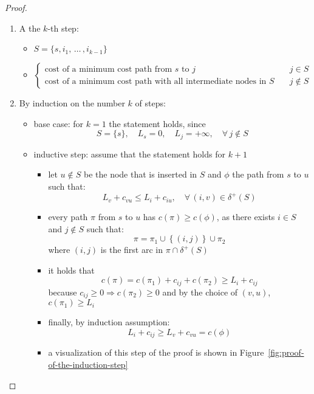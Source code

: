 \documentclass[english]{article}
\begin{document}
\begin{proof}
  \hfill
  \begin{enumerate}
    \item A the \(k\)-th step:
          \begin{itemize}
            \item \(S = \{s, i_1, \, \ldots \,, i_{k-1}\}\)
            \item \(\begin{cases}\text{cost of a minimum cost path from } s \text{ to } j & j \in S \\ \text{cost of a minimum cost path with all intermediate nodes in } S \quad & j \notin S\end{cases}\)
          \end{itemize}
    \item By induction on the number \(k\) of steps:
          \begin{itemize}
            \item base case: for \(k = 1\) the statement holds, since
                  \[S = \{s\}, \quad L_s = 0, \quad L_j = +\infty, \quad \forall \, j \notin S \]
            \item inductive step: assume that the statement holds for \(k+1\)
                  \begin{itemize}
                    \item let \(u \notin S\) be the node that is inserted in \(S\) and \(\phi\) the path from \(s\) to \(u\) such that:
                          \[ L_v + c_{vu} \leq L_i + c_{iu}, \quad \forall \, (i, v) \in \delta^+(S) \]
                    \item every path \(\pi\) from \(s\) to \(u\) has \(c(\pi) \geq c(\phi)\), as there exists \(i \in S\) and \(j \notin S\) such that:
                          \[ \pi = \pi_1 \cup \left\{ \left( i, j \right)  \right\} \cup \pi_2 \]
                          where \((i, j)\) is the first arc in \(\pi \cap \delta^+(S)\)
                    \item it holds that
                          \[ c(\pi) = c(\pi_1) + c_{ij} + c(\pi_2) \geq L_i + c_{ij} \]
                          because \(c_{ij} \geq 0 \Rightarrow c(\pi_2) \geq 0\) and by the choice of \((v, u)\), \(c(\pi_1) \geq L_i\)
                    \item finally, by induction assumption:
                          \[ L_i + c_{ij} \geq L_v + c_{vu} = c(\phi) \]
                    \item a visualization of this step of the proof is shown in Figure~\ref{fig:proof-of-the-induction-step}
                  \end{itemize}
          \end{itemize}
  \end{enumerate}
\end{proof}
\end{document}
